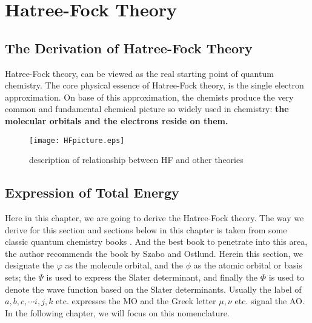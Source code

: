 %
%


\chapter{Hatree-Fock Theory}\label{HFT}
\section{The Derivation of Hatree-Fock Theory}
Hatree-Fock theory, can be viewed as the real starting point of
quantum chemistry. The core physical essence of Hatree-Fock theory,
is the single electron approximation. On base of this approximation,
the chemists produce the very common and fundamental chemical
picture so widely used in chemistry: \textbf{the molecular orbitals
and the electrons reside on them.}

\begin{figure}[!hbp]
\begin{center}
\texttt{[image: HFpicture.eps]}\label{HFT:2}
\caption{description of relationship between HF and other theories}
\end{center}
\end{figure}


\section{Expression of Total Energy}
%
%
%
%
Here in this chapter, we are going to derive the Hatree-Fock theory.
The way we derive for this section and sections below in this
chapter is taken from some classic quantum chemistry  books
\cite{levine, szabo, pople, dewar}. And the best book to penetrate
into this area, the author recommends the book by Szabo and
Ostlund\cite{szabo}. Herein this section, we designate the $\varphi$
as the molecule orbital, and the $\phi$ as the atomic orbital or
basis sets; the $\Psi$ is used to express the Slater determinant, 
and finally the $\Phi$ is used to denote the wave function based 
on the Slater determinants. Usually the label of $a,b,c,\cdots i,j,k$ etc.
expresses the MO and the Greek letter $\mu, \nu$ etc. signal the AO.
In the following chapter, we will focus on this nomenclature.

